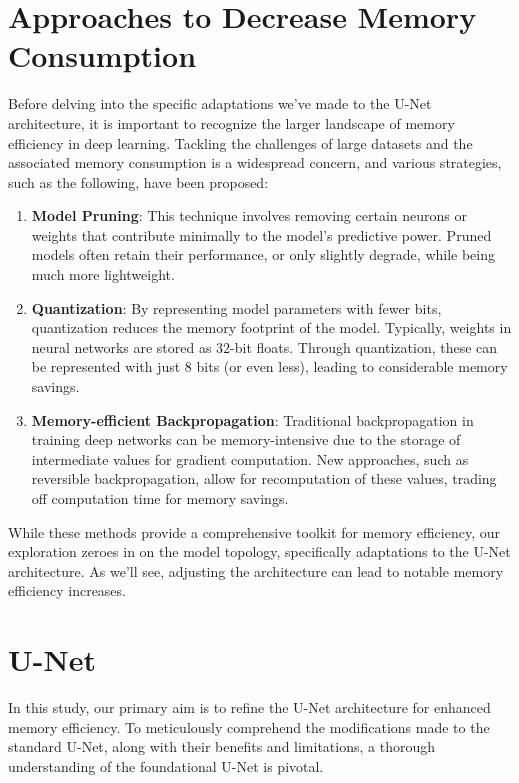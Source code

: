 \section{Approaches to Decrease Memory Consumption}
Before delving into the specific adaptations we've made to the U-Net architecture, it is important to recognize the larger landscape of memory efficiency in deep learning.
Tackling the challenges of large datasets and the associated memory consumption is a widespread concern,
and various strategies, such as the following, have been proposed:
\begin{enumerate}
	\item \textbf{Model Pruning}: This technique involves removing certain neurons or weights that contribute minimally to the model's predictive power.
	Pruned models often retain their performance, or only slightly degrade, while being much more lightweight\cite{chong_resource_2023}.
	\item \textbf{Quantization}: By representing model parameters with fewer bits, quantization reduces the memory footprint of the model. Typically,
	weights in neural networks are stored as $32$-bit floats. Through quantization, these can be represented with just $8$ bits (or even less), leading to considerable memory savings\cite{gholami_survey_2021}.
	\item \textbf{Memory-efficient Backpropagation}: Traditional backpropagation in training deep networks can be memory-intensive due to the storage of intermediate values for gradient computation.
	New approaches, such as reversible backpropagation, allow for recomputation of these values, trading off computation time for memory savings\cite{brugger_partially_2019}.
\end{enumerate}
While these methods provide a comprehensive toolkit for memory efficiency, our exploration zeroes in on the model topology, specifically adaptations to the U-Net architecture.
As we'll see, adjusting the architecture can lead to notable memory efficiency increases.

\section{U-Net}
In this study, our primary aim is to refine the U-Net architecture for enhanced memory efficiency. To meticulously comprehend the modifications made to the standard U-Net,
along with their benefits and limitations, a thorough understanding of the foundational U-Net is pivotal.

